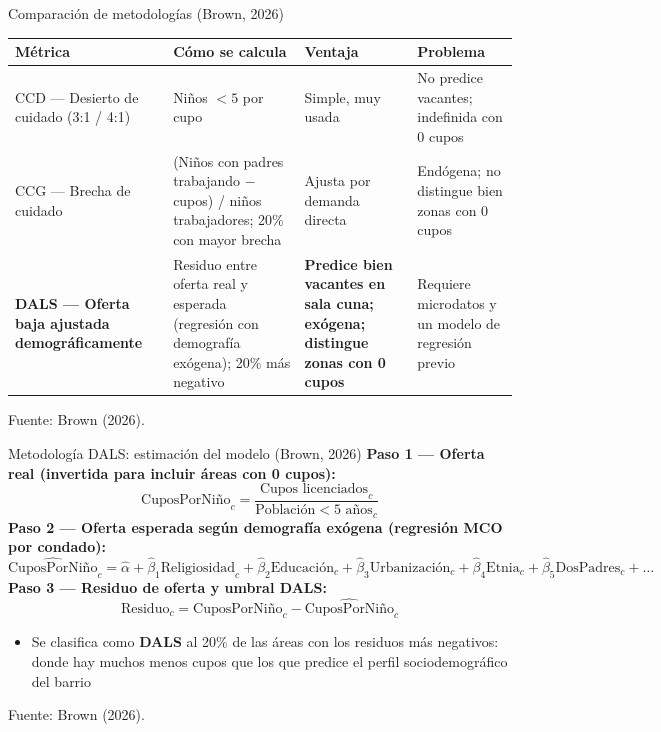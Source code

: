 \documentclass[aspectratio=169,10pt]{beamer}
\newcommand{\fuente}[1]{%
  \vfill{\color{graytext}\scriptsize Fuente: #1.}%
}
\begin{document}
\begin{frame}{Comparación de metodologías (Brown, 2026)}
  \renewcommand{\arraystretch}{1.35}
  \footnotesize
  \begin{center}
  \begin{tabular}{@{}p{2.3cm}p{3.1cm}p{2.7cm}p{2.9cm}@{}}
    \textbf{Métrica} & \textbf{Cómo se calcula} & \textbf{Ventaja} & \textbf{Problema} \\
    \hline
    CCD --- Desierto de cuidado (3:1 / 4:1) & Niños $<5$ por cupo & Simple, muy usada & No predice vacantes; indefinida con 0 cupos \\
    CCG --- Brecha de cuidado & (Niños con padres trabajando $-$ cupos) / niños trabajadores; 20\% con mayor brecha & Ajusta por demanda directa & Endógena; no distingue bien zonas con 0 cupos \\
    \rowcolor{steellight!25}
    \textbf{DALS --- Oferta baja ajustada demográficamente} & Residuo entre oferta real y esperada (regresión con demografía exógena); 20\% más negativo & \textbf{Predice bien vacantes en sala cuna; exógena; distingue zonas con 0 cupos} & Requiere microdatos y un modelo de regresión previo \\
  \end{tabular}
  \end{center}
  \fuente{Brown (2026)}
\end{frame}

\begin{frame}{Metodología DALS: estimación del modelo (Brown, 2026)}
  \small
  \textbf{Paso 1 --- Oferta real (invertida para incluir áreas con 0 cupos):}
  \[
    \text{CuposPorNiño}_c = \frac{\text{Cupos licenciados}_c}{\text{Población} < 5\text{ años}_c}
  \]
  \textbf{Paso 2 --- Oferta esperada según demografía exógena (regresión MCO por condado):}
  \[
    \widehat{\text{CuposPorNiño}}_c = \hat\alpha + \hat\beta_1 \text{Religiosidad}_c + \hat\beta_2 \text{Educación}_c + \hat\beta_3 \text{Urbanización}_c + \hat\beta_4 \text{Etnia}_c + \hat\beta_5 \text{DosPadres}_c + \dots
  \]
  \textbf{Paso 3 --- Residuo de oferta y umbral DALS:}
  \[
    \text{Residuo}_c = \text{CuposPorNiño}_c - \widehat{\text{CuposPorNiño}}_c
  \]
  \begin{itemize}[itemsep=2pt,topsep=1pt]
    \item Se clasifica como \textbf{DALS} al 20\% de las áreas con los residuos más negativos: donde hay muchos menos cupos que los que predice el perfil sociodemográfico del barrio
  \end{itemize}
  \fuente{Brown (2026)}
\end{frame}
\end{document}
